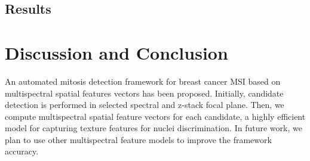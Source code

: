 \documentclass[10pt,twocolumn,letterpaper]{article}
\begin{document}
\subsection{Results}

\section{Discussion and Conclusion}
\label{sec:conclusion}
An automated mitosis detection framework for breast cancer MSI based on multispectral spatial features vectors has been proposed. Initially, candidate detection is performed in selected spectral and z-stack focal plane. Then, we compute multispectral spatial feature vectors for each candidate, a highly efficient model for capturing texture features for nuclei discrimination. In future work, we plan to use other multispectral feature models to improve the framework accuracy. 
{\small


}
\end{document}
